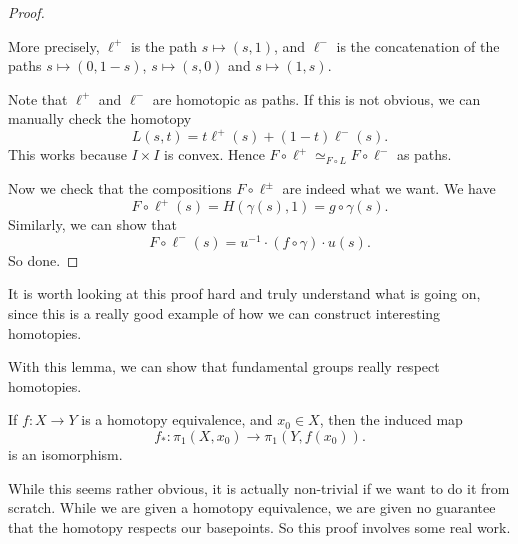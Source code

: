 \documentclass[a4paper]{article}
\begin{document}
\begin{proof}
\begin{center}
  \end{center}
  More precisely, $\ell^+$ is the path $s\mapsto (s, 1)$, and $\ell^-$ is the concatenation of the paths $s\mapsto (0, 1- s)$, $s \mapsto (s, 0)$ and $s\mapsto (1, s)$.

  Note that $\ell^+$ and $\ell^-$ are homotopic as paths. If this is not obvious, we can manually check the homotopy
  \[
    L(s, t) = t\ell^+(s) + (1 - t)\ell^- (s).
  \]
  This works because $I\times I$ is convex. Hence $F\circ \ell^+\simeq_{F\circ L} F\circ \ell^-$ as paths.

  Now we check that the compositions $F\circ \ell^{\pm}$ are indeed what we want. We have
  \[
    F\circ \ell^+ (s) = H(\gamma(s), 1) = g\circ \gamma (s).
  \]
  Similarly, we can show that
  \[
    F\circ \ell^-(s) = u^{-1}\cdot (f\circ \gamma)\cdot u (s).
  \]
  So done.
\end{proof}
It is worth looking at this proof hard and truly understand what is going on, since this is a really good example of how we can construct interesting homotopies.

With this lemma, we can show that fundamental groups really respect homotopies.

\begin{thm}
  If $f: X\to Y$ is a homotopy equivalence, and $x_0 \in X$, then the induced map
  \[
    f_*: \pi_1(X, x_0) \to \pi_1(Y, f(x_0)).
  \]
  is an isomorphism.
\end{thm}
While this seems rather obvious, it is actually non-trivial if we want to do it from scratch. While we are given a homotopy equivalence, we are given no guarantee that the homotopy respects our basepoints. So this proof involves some real work.
\end{document}
